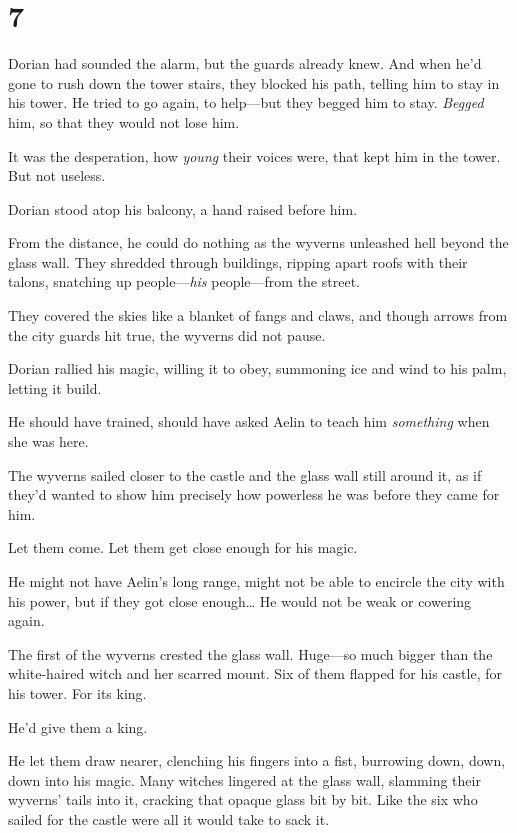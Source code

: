 
\chapter{7}

Dorian had sounded the alarm, but the guards already knew. And when he'd gone to rush down the tower stairs, they blocked his path, telling him to stay in his tower. He tried to go again, to help---but they begged him to stay. \emph{Begged} him, so that they would not lose him.

It was the desperation, how \emph{young} their voices were, that kept him in the tower. But not useless.

Dorian stood atop his balcony, a hand raised before him.

From the distance, he could do nothing as the wyverns unleashed hell beyond the glass wall. They shredded through buildings, ripping apart roofs with their talons, snatching up people---\emph{his} people---from the street.

They covered the skies like a blanket of fangs and claws, and though arrows from the city guards hit true, the wyverns did not pause.

Dorian rallied his magic, willing it to obey, summoning ice and wind to his palm, letting it build.

He should have trained, should have asked Aelin to teach him
\emph{something} when she was here.

The wyverns sailed closer to the castle and the glass wall still around it, as if they'd wanted to show him precisely how powerless he was before they came for him.

Let them come. Let them get close enough for his magic.

He might not have Aelin's long range, might not be able to encircle the city with his power, but if they got close enough\ldots{} He would not be weak or cowering again.

The first of the wyverns crested the glass wall. Huge---so much bigger than the white-haired witch and her scarred mount. Six of them flapped for his castle, for his tower. For its king.

He'd give them a king.

He let them draw nearer, clenching his fingers into a fist, burrowing down, down, down into his magic. Many witches lingered at the glass wall, slamming their wyverns' tails into it, cracking that opaque glass bit by bit. Like the six who sailed for the castle were all it would take to sack it.

